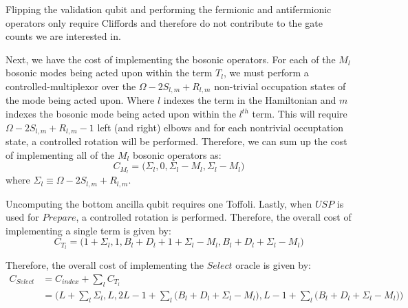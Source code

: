 Flipping the validation qubit and performing the fermionic and antifermionic operators only require Cliffords and therefore do not contribute to the gate counts we are interested in.

Next, we have the cost of implementing the bosonic operators.
For each of the $M_l$ bosonic modes being acted upon within the term $T_l$, we must perform a controlled-multiplexor over the $\Omega - 2S_{l, m} + R_{l, m}$ non-trivial occupation states of the mode being acted upon.
Where $l$ indexes the term in the Hamiltonian and $m$ indexes the bosonic mode being acted upon within the $l^{th}$ term.
This will require $\Omega - 2S_{l, m} + R_{l, m} - 1$ left (and right) elbows and for each nontrivial occuptation state, a controlled rotation will be performed.
Therefore, we can sum up the cost of implementing all of the $M_l$ bosonic operators as: 
\begin{equation}
    C_{M_l} = \Big(\Sigma_l, 0, \Sigma_l - M_l, \Sigma_l - M_l \Big)
\end{equation}
where $\Sigma_{l} \equiv \Omega - 2S_{l, m} + R_{l, m}$.


Uncomputing the bottom ancilla qubit requires one Toffoli. 
Lastly, when $USP$ is used for $\textit{Prepare}$, a controlled rotation is performed.
Therefore, the overall cost of implementing a single term  is given by:
\begin{equation}
    C_{T_l} = \Big(1 + \Sigma_l, 1, B_l + D_l + 1 + \Sigma_l - M_l, B_l + D_l + \Sigma_l - M_l \Big)
\end{equation}

Therefore, the overall cost of implementing the $\textit{Select}$ oracle is given by:
\begin{equation}
    \begin{split}
    C_{\textit{Select}} &= C_{\textit{index}} + \sum_{l} C_{T_l} \\
    &= \Big(L + \sum_l \Sigma_l, L, 2L - 1 + \sum_l \big( B_l + D_l + \Sigma_l - M_l \big), L-1 + \sum_l \big( B_l + D_l + \Sigma_l - M_l \big)\Big)
    \end{split}
\end{equation}
